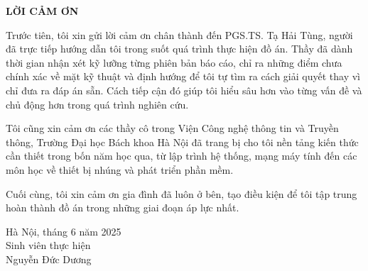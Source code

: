 \documentclass[../DoAn.tex]{subfiles}
\begin{document}
\begin{center}
    \Large{\textbf{LỜI CẢM ƠN}}\\
\end{center}
\vspace{1cm}

Trước tiên, tôi xin gửi lời cảm ơn chân thành đến PGS.TS. Tạ Hải Tùng, người đã trực tiếp hướng dẫn tôi trong suốt quá trình thực hiện đồ án. Thầy đã dành thời gian nhận xét kỹ lưỡng từng phiên bản báo cáo, chỉ ra những điểm chưa chính xác về mặt kỹ thuật và định hướng để tôi tự tìm ra cách giải quyết thay vì chỉ đưa ra đáp án sẵn. Cách tiếp cận đó giúp tôi hiểu sâu hơn vào từng vấn đề và chủ động hơn trong quá trình nghiên cứu.

Tôi cũng xin cảm ơn các thầy cô trong Viện Công nghệ thông tin và Truyền thông, Trường Đại học Bách khoa Hà Nội đã trang bị cho tôi nền tảng kiến thức cần thiết trong bốn năm học qua, từ lập trình hệ thống, mạng máy tính đến các môn học về thiết bị nhúng và phát triển phần mềm.

Cuối cùng, tôi xin cảm ơn gia đình đã luôn ở bên, tạo điều kiện để tôi tập trung hoàn thành đồ án trong những giai đoạn áp lực nhất.

\begin{flushright}
Hà Nội, tháng 6 năm 2025\\
Sinh viên thực hiện\\
\vspace{0.5cm}
Nguyễn Đức Dương
\end{flushright}
\end{document}

